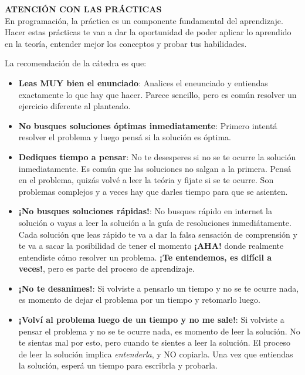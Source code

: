 \begin{tcolorbox}[colback=yellow,colframe=red!75!black,arc=0pt,outer arc=0pt]
  \textbf{ATENCIÓN CON LAS PRÁCTICAS} \\

En programación, la práctica es un componente fundamental del aprendizaje. Hacer estas prácticas te van a dar la
oportunidad de poder aplicar lo aprendido en la teoría, entender mejor los conceptos y probar tus habilidades.

La recomendación de la cátedra es que:

\begin{itemize}
\item \textbf{Leas MUY bien el enunciado}: Analices el eneunciado y entiendas exactamente lo que hay que hacer. Parece
sencillo, pero es común resolver un ejercicio diferente al planteado.

\item \textbf{No busques soluciones óptimas inmediatamente}: Primero intentá resolver el problema y luego pensá si la
solución es óptima.

\item \textbf{Dediques tiempo a pensar}: No te desesperes si no se te ocurre la solución inmediatamente. Es común que
las soluciones no salgan a la primera. Pensá en el problema, quizás volvé a leer la teória y fijate si se te ocurre. Son
problemas complejos y a veces hay que darles tiempo para que se asienten.

\item \textbf{¡No busques soluciones rápidas!}: No busques rápido en internet la solución o vayas a leer la solución a
la guía de resoluciones inmediátamente. Cada solución que leas rápido te va a dar la falsa sensación de comprensión y te
va a sacar la posibilidad de tener el momento \textbf{¡AHA!} donde realmente entendiste cómo resolver un problema.
\textbf{¡Te entendemos, es difícil a veces!}, pero es parte del proceso de aprendizaje.

\item \textbf{¡No te desanimes!}: Si volviste a pensarlo un tiempo y no se te ocurre nada, es momento de dejar el
problema por un tiempo y retomarlo luego.

\item \textbf{¡Volví al problema luego de un tiempo y no me sale!}: Si volviste a pensar el problema y no se te ocurre
nada, es momento de leer la solución. No te sientas mal por esto, pero cuando te sientes a leer la solución. El proceso
de leer la solución implica \textit{entenderla}, y NO copiarla. Una vez que entiendas la solución, esperá un tiempo para
escribrla y probarla.


\end{itemize}
\end{tcolorbox}
